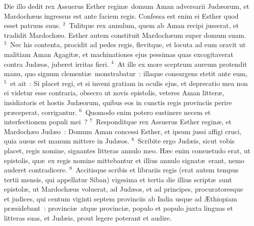 \lettrine[lines=10,image=true,loversize=0.05,lraise=-0.03]{D}{}ie illo dedit rex Assuerus Esther regin\ae\ domum Aman adversarii Jud\ae orum, et Mardoch\ae us ingressus est ante faciem regis. Confessa est enim ei Esther quod esset patruus suus.
${}^{2}$~Tulitque rex annulum, quem ab Aman recipi jusserat, et tradidit Mardoch\ae o. Esther autem constituit Mardoch\ae um super domum suam.
${}^{3}$~Nec his contenta, procidit ad pedes regis, flevitque, et locuta ad eum oravit ut malitiam Aman Agagit\ae , et machinationes ejus pessimas quas excogitaverat contra Jud\ae os, juberet irritas fieri.
${}^{4}$~At ille ex more sceptrum aureum protendit manu, quo signum clementi\ae\ monstrabatur~: illaque consurgens stetit ante eum,
${}^{5}$~et ait~: Si placet regi, et si inveni gratiam in oculis ejus, et deprecatio mea non ei videtur esse contraria, obsecro ut novis epistolis, veteres Aman litter\ae , insidiatoris et hostis Jud\ae orum, quibus eos in cunctis regis provinciis perire pr\ae ceperat, corrigantur.
${}^{6}$~Quomodo enim potero sustinere necem et interfectionem populi mei~?
${}^{7}$~Responditque rex Assuerus Esther regin\ae , et Mardoch\ae o Jud\ae o~: Domum Aman concessi Esther, et ipsum jussi affigi cruci, quia ausus est manum mittere in Jud\ae os.
${}^{8}$~Scribite ergo Jud\ae is, sicut vobis placet, regis nomine, signantes litteras annulo meo. H\ae c enim consuetudo erat, ut epistolis, qu\ae\ ex regis nomine mittebantur et illius annulo signat\ae\ erant, nemo auderet contradicere.
${}^{9}$~Accitisque scribis et librariis regis (erat autem tempus tertii mensis, qui appellatur Siban) vigesima et tertia die illius script\ae\ sunt epistol\ae , ut Mardoch\ae us voluerat, ad Jud\ae os, et ad principes, procuratoresque et judices, qui centum viginti septem provinciis ab India usque ad \AE thiopiam pr\ae sidebant~: provinci\ae\ atque provinci\ae , populo et populo juxta linguas et litteras suas, et Jud\ae is, prout legere poterant et audire.



